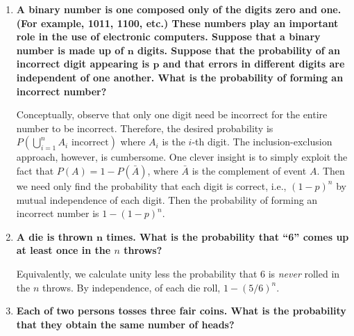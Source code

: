 \documentclass[10pt, oneside]{article}
\begin{document}
\begin{enumerate}[label=3.\arabic*]
\begin{enumerate}
	\item  \begin{tcolorbox}[
	  colback=Cerulean!5!white,
	  colframe=Cerulean!75!black]
	\textbf{the die shows an even number or the card is from a red suit?}
	\end{tcolorbox}
	
	Using the previous result, $P(\text{even } \cup \text{ red}) = P(\text{even}) + P(\text{red}) - P(\text{even } \cap \text{ red}) = 1/2 + 1/2 - 1/4 = \boxed{3/4}$.
	\end{enumerate}

\item  \begin{tcolorbox}[
  colback=Cerulean!5!white,
  colframe=Cerulean!75!black]
\textbf{A binary number is one composed only of the digits zero and one. (For example, 1011, 1100, etc.) These numbers play an important role in the use of electronic computers. Suppose that a binary number is made up of $\bm{n}$ digits. Suppose that the probability of an incorrect digit appearing is $\bm{p}$ and that errors in different digits are independent of one another. What is the probability of forming an incorrect number?}
\end{tcolorbox}

Conceptually, observe that only one digit need be incorrect for the entire number to be incorrect. Therefore, the desired probability is $P(\bigcup^n_{i=1} A_i \text{ incorrect})$ where $A_i$ is the $i$-th digit. The inclusion-exclusion approach, however, is cumbersome. One clever insight is to simply exploit the fact that $P(A) = 1 - P(\bar{A})$, where $\bar{A}$ is the complement of event $A$. Then we need only find the probability that each digit is correct, i.e., $(1-p)^n$ by mutual independence of each digit. Then the probability of forming an incorrect number is $\boxed{1 - (1-p)^n}$.

\item  \begin{tcolorbox}[
  colback=Cerulean!5!white,
  colframe=Cerulean!75!black]
\textbf{A die is thrown $\bm{n}$ times. What is the probability that ``6'' comes up at least once in the $n$ throws?}
\end{tcolorbox}

Equivalently, we calculate unity less the probability that 6 is \textit{never} rolled in the $n$ throws. By independence, of each die roll, $\boxed{1 - (5/6)^n}$.

\item  \begin{tcolorbox}[
  colback=Cerulean!5!white,
  colframe=Cerulean!75!black]
\textbf{Each of two persons tosses three fair coins. What is the probability that they obtain the same number of heads?}
\end{tcolorbox}


\end{enumerate}
\end{document}
